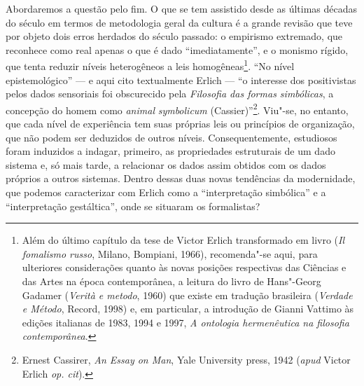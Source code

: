 Abordaremos a questão pelo fim. O que se tem assistido desde as últimas
décadas do século  em termos de metodologia geral da cultura é a
grande revisão que teve por objeto dois erros herdados do século
passado: o empirismo extremado, que reconhece como real apenas o que é
dado ``imediatamente'', e o monismo rígido, que tenta reduzir níveis
heterogêneos a leis homogêneas\footnote{Além do último capítulo da
  tese de Victor Erlich transformado em livro (\emph{Il fomalismo
  russo}, Milano, Bompiani, 1966), recomenda"-se aqui, para ulteriores
  considerações quanto às novas posições respectivas das Ciências e das
  Artes na época contemporânea, a leitura do livro de Hans"-Georg Gadamer
  (\emph{Verità e metodo}, 1960) que existe em tradução brasileira
  (\emph{Verdade e Método}, Record, 1998) e, em particular, a introdução
  de Gianni Vattimo às edições italianas de 1983, 1994 e 1997, \emph{A
  ontologia hermenêutica na filosofia contemporânea}.}. ``No nível
epistemológico'' --- e aqui cito textualmente Erlich --- ``o interesse dos
positivistas pelos dados sensoriais foi obscurecido pela \emph{Filosofia
das formas simbólicas}, a concepção do homem como \emph{animal}
\emph{symbolicum} (Cassier)''\footnote{Ernest Cassirer, \emph{An Essay
  on Man}, Yale University press, 1942 (\emph{apud} Victor Erlich \emph{op. cit}).}.
Viu"-se, no entanto, que cada nível de experiência tem suas próprias leis ou
princípios de organização, que não podem ser deduzidos de outros níveis.
Consequentemente, estudiosos foram induzidos a indagar, primeiro, as
propriedades estruturais de um dado sistema e, só mais tarde, a
relacionar os dados assim obtidos com os dados próprios a outros
sistemas. Dentro dessas duas novas tendências da modernidade, que
podemos caracterizar com Erlich como a ``interpretação simbólica'' e a
``interpretação gestáltica'', onde se situaram os formalistas?

